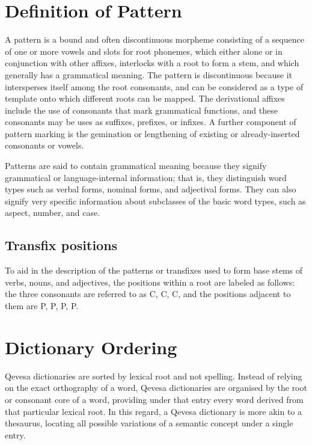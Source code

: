 \documentclass[grammar]{subfiles}
\begin{document}
	\section{Definition of Pattern}
	\label{sec:definition_of_pattern}

	A pattern is a bound and often discontinuous morpheme consisting of a sequence of one or more vowels and slots for root phonemes, which either alone or in conjunction with other affixes, interlocks with a root to form a stem, and which generally has a grammatical meaning. The pattern is discontinuous because it intersperses itself among the root consonants, and can be considered as a type of template onto which different roots can be mapped. The derivational affixes include the use of consonants that mark grammatical functions, and	these consonants may be uses as suffixes, prefixes, or infixes. A further component of pattern marking is the gemination or lengthening of existing or already-inserted consonants or vowels.

	Patterns are said to contain grammatical meaning because they signify grammatical or language-internal information; that is, they distinguish word types such as verbal forms, nominal forms, and adjectival forms. They can also signify very specific information about subclasses of the basic word types, such as aspect, number, and case.

	\subsection{Transfix positions}
	\label{ssec:transfix_positions}

	To aid in the description of the patterns or transfixes used to form base stems of verbs, nouns, and adjectives, the positions within a root are labeled as follows: the three consonants are referred to as C, C, C, and the positions adjacent to them are P, P, P, P.
	
	\section{Dictionary Ordering}
	\label{sec:dictionary_ordering}

	Qevesa dictionaries are sorted by lexical root and not spelling. Instead of relying on the exact orthography of a word, Qevesa dictionaries are organised by the root or consonant core of a word, providing under that entry every word derived from that particular lexical root. In this regard, a Qevesa dictionary is more akin to a thesaurus, locating all possible variations of a semantic concept under a single entry.
\end{document}
